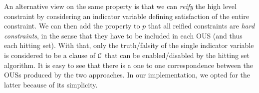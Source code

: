 An alternative view on the same property is that we can \emph{reify} the high level constraint by considering an indicator variable defining satisfaction of the entire constraint. 
We can then add the property to $p$ that all reified constraints are \emph{hard constraints}, in the sense that they have to be included in each OUS (and thus each hitting set). With that, only the truth/falsity of the single indicator variable is considered to be a clause of $\mathcal{C} $ that can be enabled/disabled by the hitting set algorithm. 
It is easy to see that there is a one to one correspondence between the OUSs produced by the two approaches. In our implementation, we opted for the latter because of its simplicity. 
